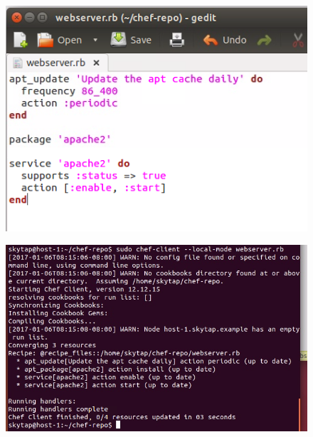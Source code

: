 \documentclass[12pt,letterpaper,boxed]{hmcpset}
\begin{document}
\begin{figure}[H]
  \centering
  \includegraphics[width = 1.0\textwidth]{17.png}
\end{figure}
\begin{figure}[H]
  \centering
  \includegraphics[width = 1.0\textwidth]{18.png}
\end{figure}
\end{document}
